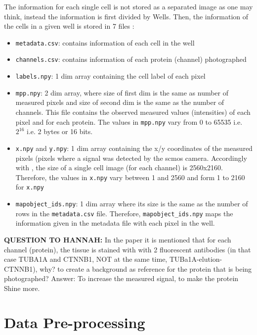 The information for each single cell is not stored as a separated image as one may think, instead the information is first divided by Wells. Then, the information of the cells in a given well is stored in 7 files :
\begin{itemize}
  \item \texttt{metadata.csv}: contains information of each cell in the well
  \item \texttt{channels.csv}: contains information of each protein (channel) photographed
  \item \texttt{labels.npy}: 1 dim array containing the cell label of each pixel
  \item \texttt{mpp.npy}: 2 dim array, where size of first dim is the same as number of measured pixels and size of second dim is the same as the number of channels. This file contains the observed measured values (intensities) of each pixel and for each protein. The values in \texttt{mpp.npy} vary from 0 to 65535 i.e. $2^{16}$ i.e. 2 bytes or 16 bits.
  \item \texttt{x.npy} and \texttt{y.npy}: 1 dim array containing the x/y coordinates of the measured pixels (pixels where a signal was detected by the \gls{scmos} camera. Accordingly with \cite{Guteaar7042}, the size of a single cell image (for each channel) is 2560x2160. Therefore, the values in \texttt{x.npy} vary between 1 and 2560 and form 1 to 2160 for \texttt{x.npy}
  \item \texttt{mapobject\_ids.npy}: 1 dim array where its size is the same as the number of rows in the \texttt{metadata.csv} file. Therefore, \texttt{mapobject\_ids.npy} maps the information given in the metadata file with each pixel in the well.
\end{itemize}

\textbf{QUESTION TO HANNAH:} In the paper it is mentioned that for each channel (protein), the tissue is stained with with 2 fluorescent antibodies (in that case TUBA1A and CTNNB1, NOT at the same time, TUBa1A-elution-CTNNB1), why? to create a background as reference for the protein that is being photographed?
Answer: To increase the measured signal, \ie to make the protein Shine more.

\section{Data Pre-processing}
\label{sec:Data_Preprocessing}

